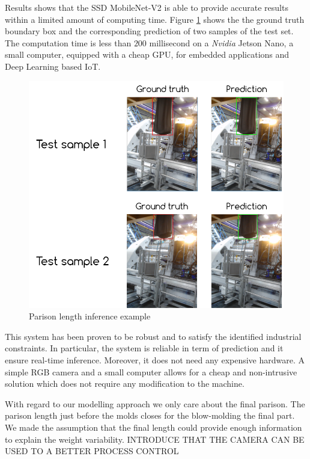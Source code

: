 Results shows that the SSD MobileNet-V2 is able to provide accurate results within a limited amount of computing time. Figure \ref{fig:parison_inference} shows the the ground truth boundary box and the corresponding prediction of two samples of the test set. The computation time is less than $200$ millisecond on a \textit{Nvidia} Jetson Nano, a small computer, equipped with a cheap GPU, for embedded applications and Deep Learning based IoT. 
%
\begin{figure}
\centerline{\includegraphics[scale=0.8]{images/chapter_3/parison_length_gt_prediction.png}}
\caption{Parison length inference example}
\label{fig:parison_inference}
\end{figure}
%
This system has been proven to be robust and to satisfy the identified industrial constraints. In particular, the system is reliable in term of prediction and it ensure real-time inference. Moreover, it does not need any expensive hardware. A simple RGB camera and a small computer allows for a cheap and non-intrusive solution which does not require any modification to the machine. 

With regard to our modelling approach we only care about the final parison. The parison length just before the molds closes for the blow-molding the final part. We made the assumption that the final length could provide enough information to explain the weight variability. INTRODUCE THAT THE CAMERA CAN BE USED TO A BETTER PROCESS CONTROL   

